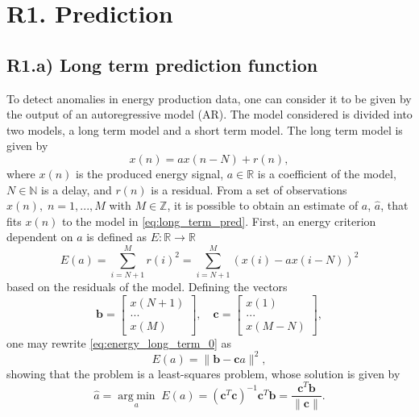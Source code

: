 \documentclass[a4paper, oneside, 11pt]{article}
\begin{document}
\newpage
{}
\setcounter{page}{1}

\section{R1. Prediction}\label{sec:r1}

\subsection{R1.a) Long term prediction function}

To detect anomalies in energy production data, one can consider it to be given by the output of an autoregressive model (AR). The model considered is divided into two models, a long term model and a short term model. The long term model is given by
\begin{equation} \label{eq:long_term_pred}
    x(n) = a x(n-N) + r(n),
\end{equation}
where $x(n)$ is the produced energy signal, $a \in \mathbb{R}$ is a coefficient of the model, $N \in \mathbb{N}$ is a delay, and $r(n)$ is a residual. From a set of observations $x(n), \; n = 1, ..., M$ with $M \in \mathbb{Z}$, it is possible to obtain an estimate of $a$, $\hat{a}$, that fits $x(n)$ to the model in \eqref{eq:long_term_pred}. First, an energy criterion dependent on $a$ is defined as $E: \mathbb{R} \rightarrow \mathbb{R}$
\begin{equation} \label{eq:energy_long_term_0}
    E(a) = \sum_{i = N+1}^{M} r(i)^2 = \sum_{i = N+1}^{M} \left (x(i) - a x(i-N) \right)^2
\end{equation}
based on the residuals of the model. Defining the vectors
\begin{equation*}
    \mathbf{b} = \begin{bmatrix} x(N+1) \\ ... \\ x(M)\end{bmatrix}, \quad \mathbf{c} = \begin{bmatrix} x(1) \\ ... \\ x(M-N) \end{bmatrix},
\end{equation*}
one may rewrite \eqref{eq:energy_long_term_0} as
\begin{equation} \label{eq:energy_long_term}
    E(a) = \| \mathbf{b} - \mathbf{c} a \|^2,
\end{equation}
showing that the problem is a least-squares problem, whose solution is given by
\begin{equation} \label{eq:long_term_est}
    \hat{a} = \underset{a}{\operatorname{arg \; min}} \; E(a) = (\mathbf{c}^T \mathbf{c})^{-1} \mathbf{c}^T \mathbf{b} = \dfrac{\mathbf{c}^T \mathbf{b}}{\| \mathbf{c} \|}.
\end{equation}
\end{document}
